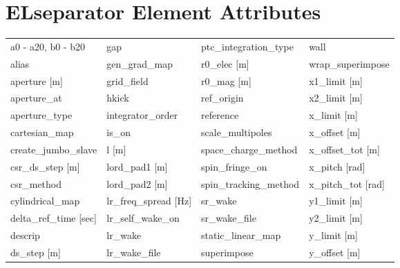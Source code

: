  \section{ELseparator Element Attributes}
 \label{s:list.elseparator}
 
 \begin{tabular}{llll} \toprule
a0 - a20, b0 - b20               & gap                              & ptc_integration_type             & wall                             \\
alias                            & gen_grad_map                     & r0_elec [m]                      & wrap_superimpose                 \\
aperture [m]                     & grid_field                       & r0_mag [m]                       & x1_limit [m]                     \\
aperture_at                      & hkick                            & ref_origin                       & x2_limit [m]                     \\
aperture_type                    & integrator_order                 & reference                        & x_limit [m]                      \\
cartesian_map                    & is_on                            & scale_multipoles                 & x_offset [m]                     \\
create_jumbo_slave               & l [m]                            & space_charge_method              & x_offset_tot [m]                 \\
csr_ds_step [m]                  & lord_pad1 [m]                    & spin_fringe_on                   & x_pitch [rad]                    \\
csr_method                       & lord_pad2 [m]                    & spin_tracking_method             & x_pitch_tot [rad]                \\
cylindrical_map                  & lr_freq_spread [Hz]              & sr_wake                          & y1_limit [m]                     \\
delta_ref_time [sec]             & lr_self_wake_on                  & sr_wake_file                     & y2_limit [m]                     \\
descrip                          & lr_wake                          & static_linear_map                & y_limit [m]                      \\
ds_step [m]                      & lr_wake_file                     & superimpose                      & y_offset [m]                     \\

\end{tabular}
